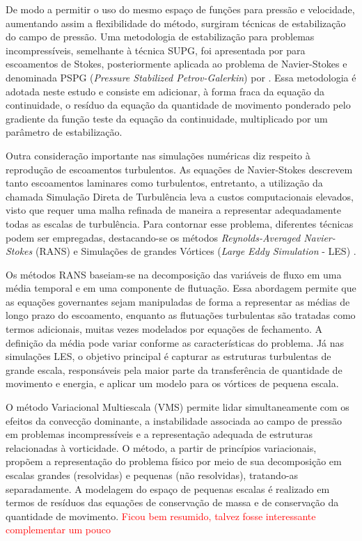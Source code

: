 \documentclass[tese_patricia.tex]{subfiles}
\begin{document}
De modo a permitir o uso do mesmo espaço de funções para pressão e velocidade, aumentando assim a flexibilidade do método, surgiram técnicas de estabilização do campo de pressão. Uma metodologia de estabilização para problemas incompressíveis, semelhante à técnica SUPG, foi apresentada por  para escoamentos de Stokes, posteriormente aplicada ao problema de Navier-Stokes e denominada PSPG (\textit{Pressure Stabilized Petrov-Galerkin}) por . Essa metodologia é adotada neste estudo e consiste em adicionar, à forma fraca da equação da continuidade, o resíduo da equação da quantidade de movimento ponderado pelo gradiente da função teste da equação da continuidade, multiplicado por um parâmetro de estabilização.

Outra consideração importante nas simulações numéricas diz respeito à reprodução de escoamentos turbulentos. As equações de Navier-Stokes descrevem tanto escoamentos laminares como turbulentos, entretanto, a utilização da chamada Simulação Direta de Turbulência leva a custos computacionais elevados, visto que requer uma malha refinada de maneira a representar adequadamente todas as escalas de turbulência. Para contornar esse problema, diferentes técnicas podem ser empregadas, destacando-se os métodos \textit{Reynolds-Averaged Navier-Stokes} (RANS) \cite{Speziale1991,Alfonsi2009} e Simulações de grandes Vórtices (\textit{Large Eddy Simulation} - LES) \cite{LaunderS:1972,Germano1991,Wilcox:1993,PIOMELLI1999}.

Os métodos RANS baseiam-se na decomposição das variáveis de fluxo em uma média temporal e em uma componente de flutuação. Essa abordagem permite que as equações governantes sejam manipuladas de forma a representar as médias de longo prazo do escoamento, enquanto as flutuações turbulentas são tratadas como termos adicionais, muitas vezes modelados por equações de fechamento. A definição da média pode variar conforme as características do problema. Já nas simulações LES, o objetivo principal é capturar as estruturas turbulentas de grande escala, responsáveis pela maior parte da transferência de quantidade de movimento e energia, e aplicar um modelo para os vórtices de pequena escala.

O método Variacional Multiescala (VMS) \cite{Hughes:1995,Hughesetal:1998,Hughesetal:2001,BazilevsTT:2013} permite lidar simultaneamente com os efeitos da convecção dominante, a instabilidade associada ao campo de pressão em problemas incompressíveis e a representação adequada de estruturas relacionadas à vorticidade. O método, a partir de princípios variacionais, propõem a representação do problema físico por meio de sua decomposição em escalas grandes (resolvidas) e pequenas (não resolvidas), tratando-as separadamente.  A modelagem do espaço de pequenas escalas é realizado em termos de resíduos das equações de conservação de massa e de conservação da quantidade de movimento. 
\textcolor{red}{Ficou bem resumido, talvez fosse interessante complementar um pouco}
\end{document}
